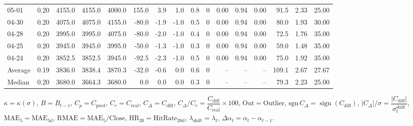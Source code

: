 \begin{threeparttable}
{\begin{tabular}{lrrrrrrrrrrrrrrr}
  05-01 &     0.20 & 4155.0 & 4155.0 & 4000.0 &      155.0 &            3.9 &                      1.0 &                 0.8 &              0 &       0.00 &      0.94 &           0.00 &             91.5 &            2.33 &                  25.00 \\
  04-30 &     0.20 & 4075.0 & 4075.0 & 4155.0 &      -80.0 &           -1.9 &                     -1.0 &                 0.5 &              0 &       0.00 &      0.94 &           0.00 &             80.0 &            1.93 &                  30.00 \\
  04-28 &     0.20 & 3995.0 & 3995.0 & 4075.0 &      -80.0 &           -2.0 &                     -1.0 &                 0.4 &              0 &       0.00 &      0.94 &           0.00 &             72.5 &            1.76 &                  35.00 \\
  04-25 &     0.20 & 3945.0 & 3945.0 & 3995.0 &      -50.0 &           -1.3 &                     -1.0 &                 0.3 &              0 &       0.00 &      0.94 &           0.00 &             59.0 &            1.48 &                  35.00 \\
  04-24 &     0.20 & 3852.5 & 3852.5 & 3945.0 &      -92.5 &           -2.3 &                     -1.0 &                 0.5 &              0 &       0.00 &      0.94 &           0.00 &             75.0 &            1.92 &                  35.00 \\
Average &     0.19 & 3836.0 & 3838.4 & 3870.3 &      -32.0 &           -0.6 &                      0.0 &                 0.6 &              0 &         -- &        -- &             -- &            109.1 &            2.67 &                  27.67 \\
 Median &     0.20 & 3680.0 & 3664.3 & 3680.0 &        0.0 &            0.0 &                      0.0 &                 0.3 &              0 &         -- &        -- &             -- &             79.3 &            2.23 &                  25.00 \\
\bottomrule
\end{tabular}
}
\begin{tablenotes}\footnotesize
\item $\kappa=\kappa(\sigma)$, $B=B_{t-1}$, $C_p=C_{\text{pred}}$, $C_r=C_{\text{real}}$, $C_\Delta=C_{\text{diff}}$, $C_\Delta/C_r=\dfrac{C_{\text{diff}}}{C_{\text{real}}}\times100$, $\mathrm{Out}=\text{Outlier}$, $\mathrm{sgn}\,C_\Delta=\operatorname{sign}(C_{\text{diff}})$, $|C_\Delta|/\sigma=\dfrac{|C_{\text{diff}}|}{\sigma_t^{\text{shift}}}$, $\mathrm{MAE}_5=\mathrm{MAE}_{5\text{d}}$, $\mathrm{RMAE}= \mathrm{MAE}_5 / \text{Close}$, $\mathrm{HR}_{20}=\mathrm{HitRate}_{20\text{d}}$, 
$\lambda_{\text{shift}}=\lambda_t$, 
$\Delta\alpha_t=\alpha_t-\alpha_{t-1}$.
\end{tablenotes}
\end{threeparttable}
\endgroup

